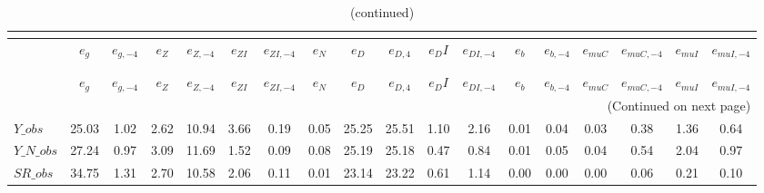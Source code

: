  
\begin{center}
\begin{longtable}{lccccccccccccccccc} 
\caption{VARIANCE DECOMPOSITION (in percent)}\\
 \label{Table:th_var_decomp_uncond}\\
\toprule 
$               $	 & 	 $           {e_g}$	 & 	 $      {e_{g,-4}}$	 & 	 $           {e_Z}$	 & 	 $      {e_{Z,-4}}$	 & 	 $        {e_{ZI}}$	 & 	 $     {e_{ZI,-4}}$	 & 	 $           {e_N}$	 & 	 $           {e_D}$	 & 	 $       {e_{D,4}}$	 & 	 $          {e_DI}$	 & 	 $     {e_{DI,-4}}$	 & 	 $           {e_b}$	 & 	 $      {e_{b,-4}}$	 & 	 $       {e_{muC}}$	 & 	 $    {e_{muC,-4}}$	 & 	 $       {e_{muI}}$	 & 	 $    {e_{muI,-4}}$\\
\midrule \endfirsthead 
\caption{(continued)}\\
 \toprule \\ 
$               $	 & 	 $           {e_g}$	 & 	 $      {e_{g,-4}}$	 & 	 $           {e_Z}$	 & 	 $      {e_{Z,-4}}$	 & 	 $        {e_{ZI}}$	 & 	 $     {e_{ZI,-4}}$	 & 	 $           {e_N}$	 & 	 $           {e_D}$	 & 	 $       {e_{D,4}}$	 & 	 $          {e_DI}$	 & 	 $     {e_{DI,-4}}$	 & 	 $           {e_b}$	 & 	 $      {e_{b,-4}}$	 & 	 $       {e_{muC}}$	 & 	 $    {e_{muC,-4}}$	 & 	 $       {e_{muI}}$	 & 	 $    {e_{muI,-4}}$\\
\midrule \endhead 
\midrule \multicolumn{18}{r}{(Continued on next page)} \\ \bottomrule \endfoot 
\bottomrule \endlastfoot 
$Y\_obs         $	 & 	           25.03	 & 	            1.02	 & 	            2.62	 & 	           10.94	 & 	            3.66	 & 	            0.19	 & 	            0.05	 & 	           25.25	 & 	           25.51	 & 	            1.10	 & 	            2.16	 & 	            0.01	 & 	            0.04	 & 	            0.03	 & 	            0.38	 & 	            1.36	 & 	            0.64 \\ 
$Y\_N\_obs      $	 & 	           27.24	 & 	            0.97	 & 	            3.09	 & 	           11.69	 & 	            1.52	 & 	            0.09	 & 	            0.08	 & 	           25.19	 & 	           25.18	 & 	            0.47	 & 	            0.84	 & 	            0.01	 & 	            0.05	 & 	            0.04	 & 	            0.54	 & 	            2.04	 & 	            0.97 \\ 
$SR\_obs        $	 & 	           34.75	 & 	            1.31	 & 	            2.70	 & 	           10.58	 & 	            2.06	 & 	            0.11	 & 	            0.01	 & 	           23.14	 & 	           23.22	 & 	            0.61	 & 	            1.14	 & 	            0.00	 & 	            0.00	 & 	            0.00	 & 	            0.06	 & 	            0.21	 & 	            0.10 \\ 

\end{longtable}
\end{center}
